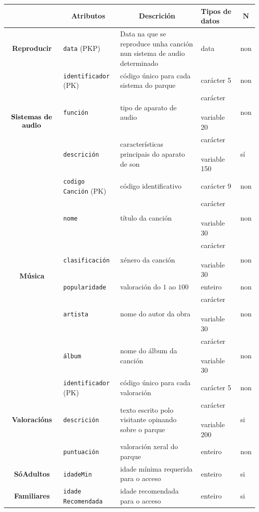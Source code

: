 \documentclass[12pt,a4paper]{book}
\theoremstyle{definition}
\theoremstyle{break}
\begin{document}
	\newpage
	
	\begin{table} [H] \centering
		\begin{tabular}{|c|m{3cm}|m{4cm}|m{2cm}|m{0.7cm}|}
			\hline \rowcolor{gris}
			\multicolumn{1}{|m{2.5cm}|}{Entidade ou relación} & \multicolumn{1}{c|}{Atributos} & \multicolumn{1}{c|}{Descrición} & \multicolumn{1}{m{2cm}|}{Tipos de datos} & \multicolumn{1}{c|}{$\mathbf{N}$} \\
			\hline
			\textbf{Reproducir} & \texttt{data} (PKP) & Data na que se reproduce unha canción nun sistema de audio determinado & data & non\\
			\hline
			\multirow{3}{*}{$\begin{array}{c}
					\text{\textbf{Sistemas de}}\\\text{\textbf{audio}}
			\end{array}$} & \texttt{identificador} (PK) & código único para cada sistema do parque & carácter 5 & non\\
			\cline{2-5}
			&\texttt{función} & tipo de aparato de audio &  carácter \textcolor{white}{aa} variable 20 & non\\
			\cline{2-5}
			& \texttt{descrición} & características principais do aparato de son &  carácter \textcolor{white}{aa} variable 150 & sí\\
			\cline{2-5}
			\hline
			\multirow{6}{*}{\textbf{Música}} & \texttt{codigo Canción} (PK) & código identificativo & carácter 9 & non\\
			\cline{2-5}
			& \texttt{nome} & título da canción &  carácter \textcolor{white}{aa} variable 30 & non\\
			\cline{2-5}
			&\texttt{clasificación} & xénero da canción &  carácter \textcolor{white}{aa} variable 30 & non\\
			\cline{2-5}
			& \texttt{popularidade} & valoración do $1$ ao $100$ & enteiro & non\\
			\cline{2-5}
			& \texttt{artista} & nome do autor da obra &  carácter \textcolor{white}{aa} variable 30 & non\\
			\cline{2-5}
			& \texttt{álbum} & nome do álbum da canción &  carácter \textcolor{white}{aa} variable 30 & non\\
			\hline
			\multirow{3}{*}{\textbf{Valoracións}} & \texttt{identificador} (PK) & código único para cada valoración & carácter 5 & non\\
			\cline{2-5}
			&\texttt{descrición} & texto escrito polo visitante opinando sobre o parque &  carácter \textcolor{white}{aa} variable 200 & si\\
			\cline{2-5}
			& \texttt{puntuación} & valoración xeral do parque &  enteiro & non\\
			\cline{2-5}
			\hline
			\textbf{SóAdultos} & \texttt{idadeMin} & idade mínima requerida para o acceso & enteiro & si\\
			\hline
			\textbf{Familiares} & \texttt{idade Recomendada } & idade recomendada para o acceso & enteiro & si\\
			\hline 
			
		\end{tabular}
	\end{table}
	
\end{document}

